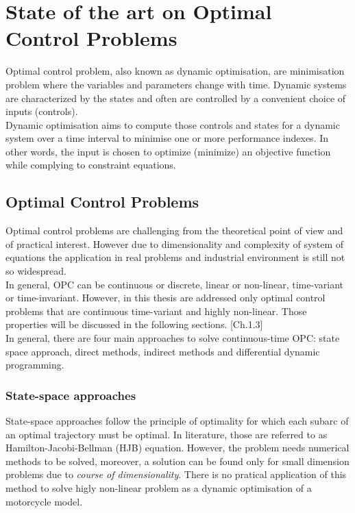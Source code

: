 \section{State of the art on Optimal Control Problems} 

Optimal control problem, also known as dynamic optimisation, are minimisation problem where the variables and parameters change with time. Dynamic systems are characterized by the states and often are controlled by a convenient choice of inputs (controls).\\
Dynamic optimisation aims to compute those controls and states for a dynamic system over a time interval to minimise one or more performance indexes. In other words, the input is chosen to optimize (minimize) an objective function while complying to constraint equations.

\subsection{Optimal Control Problems}
Optimal control problems are challenging from the theoretical point of view and of practical interest. However due to dimensionality and complexity of system of equations the application in real problems and industrial environment is still not so widespread.\\
In general, OPC can be continuous or discrete, linear or non-linear, time-variant or time-invariant. However, in this thesis are addressed only optimal control problems that are continuous time-variant and highly non-linear. Those properties will be discussed in the following sections. [Ch.1.3]\\%
In general, there are four main approaches to solve continuous-time OPC: state space approach, direct methods, indirect methods and differential dynamic programming.


\subsubsection{State-space approaches}

State-space approaches follow the principle of optimality for which each subarc of an optimal trajectory must be optimal. In literature, those are referred to as Hamilton-Jacobi-Bellman (HJB) equation. However, the problem needs numerical methods to be solved, moreover, a solution can be found only for small dimension problems due to \textit{course of dimensionality}. There is no pratical application of this method to solve higly non-linear problem as a dynamic optimisation of a motorcycle model.

